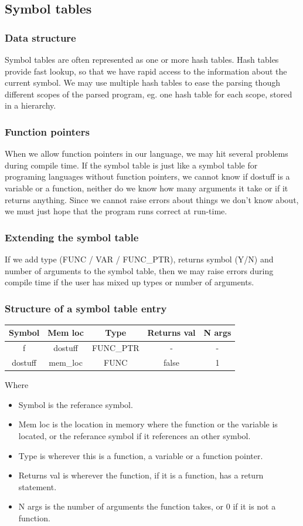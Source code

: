 \documentclass{article}
\begin{document}
\subsection{Symbol tables}
\subsubsection{Data structure}
Symbol tables are often represented as one or more hash tables. Hash tables
provide fast lookup, so that we have rapid access to the information about the
current symbol. We may use multiple hash tables to ease the parsing though
different scopes of the parsed program, eg. one hash table for each scope,
stored in a hierarchy.

\subsubsection{Function pointers}
When we allow function pointers in our language, we may hit several problems
during compile time. If the symbol table is just like a symbol table for
programing languages without function pointers, we cannot know if {\ttfamily
dostuff} is a variable or a function, neither do we know how many arguments it
take or if it returns anything. Since we cannot raise errors about things we
don't know about, we must just hope that the program runs correct at run-time.

\subsubsection{Extending the symbol table}
If we add type (FUNC / VAR / FUNC\_PTR), returns symbol (Y/N) and number of
arguments to the symbol table, then we may raise errors during compile time if the user has mixed
up types or number of arguments.

\subsubsection{Structure of a symbol table entry}
\begin{tabular}{|c|c|c|c|c|}
\hline
\textbf{Symbol} & \textbf{Mem loc} & \textbf{Type} & \textbf{Returns val} & \textbf{N
args}\\
\hline
f & dostuff & FUNC\_PTR & - & -\\
dostuff & {\ttfamily mem\_loc} & FUNC & false & 1\\
\hline
\end{tabular}

Where
\begin{itemize}
  \item Symbol is the referance symbol.
  \item Mem loc is the location in memory
where the function or the variable is located, or the referance symbol if it
references an other symbol.
\item Type is wherever this is a function, a variable or a function pointer.
\item Returns val is wherever the function, if it is a function, has a
return statement.
\item N args is the number of arguments the function takes, or 0 if it is not a
function.
\end{itemize}
\end{document}
